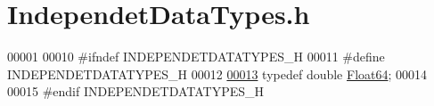 \hypertarget{_independet_data_types_8h_source}{}\section{Independet\+Data\+Types.\+h}
\label{_independet_data_types_8h_source}

\begin{DoxyCode}
00001 
00010 \textcolor{preprocessor}{#ifndef INDEPENDETDATATYPES\_H}
00011 \textcolor{preprocessor}{#define INDEPENDETDATATYPES\_H}
00012 
\hyperlink{group___tools_ga3f1431cb9f76da10f59246d1d743dc2c}{00013} \textcolor{keyword}{typedef} \textcolor{keywordtype}{double} \hyperlink{group___tools_ga3f1431cb9f76da10f59246d1d743dc2c}{Float64};
00014 
00015 \textcolor{preprocessor}{#endif  INDEPENDETDATATYPES\_H}
\end{DoxyCode}
